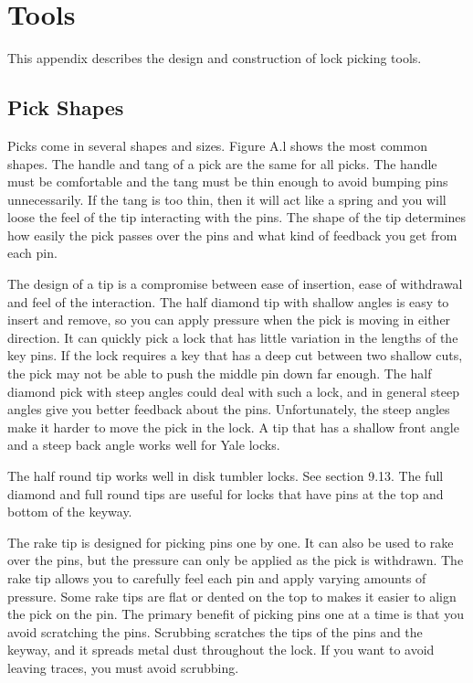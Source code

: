 \appendix
\chapter{Tools}
This appendix describes the design and construction of lock picking tools.

\section{Pick Shapes}
Picks come in several shapes and sizes. Figure A.l shows the most common shapes. The 
handle and tang of a pick are the same for all picks. The handle must be comfortable and 
the tang must be thin enough to avoid bumping pins unnecessarily. If the tang is too thin, 
then it will act like a spring and you will loose the feel of the tip interacting with the pins. 
The shape of the tip determines how easily the pick passes over the pins and what kind of 
feedback you get from each pin. 

The design of a tip is a compromise between ease of insertion, ease of withdrawal and feel 
of the interaction. The half diamond tip with shallow angles is easy to insert and remove, 
so you can apply pressure when the pick is moving in either direction. It can quickly pick a 
lock that has little variation in the lengths of the key pins. If the lock requires a key that 
has a deep cut between two shallow cuts, the pick may not be able to push the middle pin 
down far enough. The half diamond pick with steep angles could deal with such a lock, and 
in general steep angles give you better feedback about the pins. Unfortunately, the steep 
angles make it harder to move the pick in the lock. A tip that has a shallow front angle and 
a steep back angle works well for Yale locks. 

The half round tip works well in disk tumbler locks. See section 9.13. The full diamond 
and full round tips are useful for locks that have pins at the top and bottom of the keyway. 

The rake tip is designed for picking pins one by one. It can also be used to rake over 
the pins, but the pressure can only be applied as the pick is withdrawn. The rake tip allows 
you to carefully feel each pin and apply varying amounts of pressure. Some rake tips are flat 
or dented on the top to makes it easier to align the pick on the pin. The primary benefit 
of picking pins one at a time is that you avoid scratching the pins. Scrubbing scratches the 
tips of the pins and the keyway, and it spreads metal dust throughout the lock. If you want 
to avoid leaving traces, you must avoid scrubbing. 

